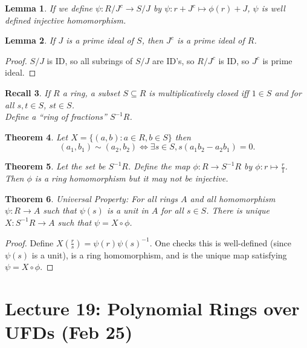 \documentclass[a4paper,12pt]{article}
\newtheorem{thm}{Theorem}[section]
\newtheorem{lem}[thm]{Lemma}
\newtheorem{rec}[thm]{Recall}
\begin{document}
\begin{lem}
    If we define $\psi:R/J^c\to S/J$ by $\psi:r+J^c\mapsto \phi(r)+J$, $\psi$ is well defined injective homomorphism.
\end{lem}
\begin{lem}
    If $J$ is a prime ideal of $S$, then $J^c$ is a prime ideal of $R$.
\end{lem}
\begin{proof}
    $S/J$ is ID, so all subrings of $S/J$ are ID's, so $R/J^c$ is ID, so $J^c$ is prime ideal. 
\end{proof}
\begin{rec}
    If $R$ a ring, a subset $S\subseteq R$ is multiplicatively closed iff $1\in S$ and for all $s,t\in S$, $st\in S$. \\
    Define a ``ring of fractions'' $S^{-1}R$.
\end{rec}
\begin{thm}
    Let $X= \{(a,b):a\in R, b\in S\}$ then \[
    (a_1,b_1)\sim (a_2,b_2) \iff \exists s\in S, s(a_1b_2-a_2b_1)=0
    .\] 
\end{thm}
\begin{thm}
    Let the set be $S^{-1}R$. Define the map $\phi:R\to S^{-1}R$ by $\phi:r\mapsto \frac{r}{1}$. Then $\phi$ is a ring homomorphism but it may not be injective.
\end{thm}
\begin{thm}
    Universal Property: For all rings $A$ and all homomorphism $\psi:R\to A$ such that $\psi(s)$ is a unit in $A$ for all $s\in S$. There is unique $X:S^{-1}R\to A$ such that $\psi=X\circ \phi$.
    \begin{center}
    \end{center}
\end{thm}
\begin{proof}
    Define $X\left(\tfrac{r}{s}\right)=\psi(r)\psi(s)^{-1}$. One checks this is well-defined (since $\psi(s)$ is a unit), is a ring homomorphism, and is the unique map satisfying $\psi=X\circ\phi$.
\end{proof}
\newpage
\section{Lecture 19: Polynomial Rings over UFDs (Feb 25)}
\end{document}
